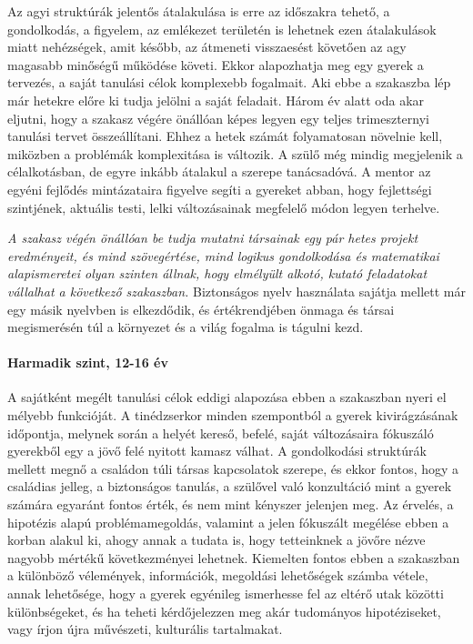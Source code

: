 Az agyi struktúrák jelentős átalakulása is erre az időszakra tehető, a gondolkodás, a figyelem, az emlékezet területén is lehetnek ezen átalakulások miatt nehézségek, amit később, az átmeneti visszaesést követően az agy magasabb minőségű működése követi. Ekkor alapozhatja meg egy gyerek a tervezés, a saját tanulási célok komplexebb fogalmait. Aki ebbe a szakaszba lép már hetekre előre ki tudja jelölni a saját feladait. Három év alatt oda akar eljutni, hogy a szakasz végére önállóan képes legyen egy teljes trimeszternyi tanulási tervet összeállítani. Ehhez a hetek számát folyamatosan növelnie kell, miközben a problémák komplexitása is változik. A szülő még mindig megjelenik a célalkotásban, de egyre inkább átalakul a szerepe tanácsadóvá. A mentor az egyéni fejlődés mintázataira figyelve segíti a gyereket abban, hogy fejlettségi szintjének, aktuális testi, lelki változásainak megfelelő módon legyen terhelve.

\emph{A szakasz végén önállóan be tudja mutatni társainak egy pár hetes projekt eredményeit, és mind szövegértése, mind logikus gondolkodása és matematikai alapismeretei olyan szinten állnak, hogy elmélyült alkotó, kutató feladatokat vállalhat a következő szakaszban.} Biztonságos nyelv használata sajátja mellett már egy másik nyelvben is elkezdődik, és értékrendjében önmaga és társai megismerésén túl a környezet és a világ fogalma is tágulni kezd.

\paragraph{Harmadik szint, 12-16 év}

A sajátként megélt tanulási célok eddigi alapozása ebben a szakaszban nyeri el mélyebb funkcióját. A tinédzserkor minden szempontból a gyerek kivirágzásának időpontja, melynek során a helyét kereső, befelé, saját változásaira fókuszáló gyerekből egy a jövő felé nyitott kamasz válhat. A gondolkodási struktúrák mellett megnő a családon túli társas kapcsolatok szerepe, és ekkor fontos, hogy a családias jelleg, a biztonságos tanulás, a szülővel való konzultáció mint a gyerek számára egyaránt fontos érték, és nem mint kényszer jelenjen meg. Az érvelés, a hipotézis alapú problémamegoldás, valamint a jelen fókuszált megélése ebben a korban alakul ki, ahogy annak a tudata is, hogy tetteinknek a jövőre nézve nagyobb mértékű következményei lehetnek. Kiemelten fontos ebben a szakaszban a különböző vélemények, információk, megoldási lehetőségek számba vétele, annak lehetősége, hogy a gyerek egyénileg ismerhesse fel az eltérő utak közötti különbségeket, és ha teheti kérdőjelezzen meg akár tudományos hipotéziseket, vagy írjon újra művészeti, kulturális tartalmakat.

